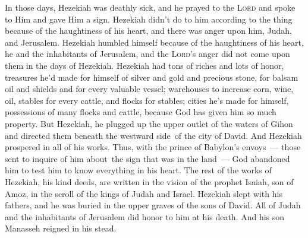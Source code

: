 \begin{inparaenum}
     In those days, Hezekiah was deathly sick, and he prayed to the \textsc{Lord} and spoke to Him and gave Him a sign.%
     Hezekiah didn't do to him according to the thing because of the haughtiness of his heart, and there was anger upon him, Judah, and Jerusalem.%
     Hezekiah humbled himself because of the haughtiness of his heart, he and the inhabitants of Jerusalem, and the \textsc{Lord}'s anger did not come upon them in the days of Hezekiah.%
     Hezekiah had tons of riches and lots of honor, treasures he'd made for himself of silver and gold and precious stone, for balsam oil and shields and for every valuable vessel;%
     warehouses to increase corn, wine, oil, stables for every cattle, and flocks for stables;%
     cities he's made for himself, possessions of many flocks and cattle, because God has given him so much property.%
     But Hezekiah, he plugged up the upper outlet of the waters of Gihon and directed them beneath the westward side\understood\ of the city of David. And Hezekiah prospered in all of his works.%
     Thus, with the prince of Babylon's envoys~--- those sent to inquire of him about\understood\ the sign that was in the land~--- God abandoned him to test him to know everything in his heart.%
     The rest of the works of Hezekiah, his kind deeds, are written in the vision of the prophet Isaiah, son of Amoz, in the scroll of the kings of Judah and Israel.%
     Hezekiah slept with his fathers, and he was buried in the upper graves of the sons of David. All of Judah and the inhabitants of Jerusalem did honor to him at his death. And his son Manasseh reigned in his stead.%
\end{inparaenum}

